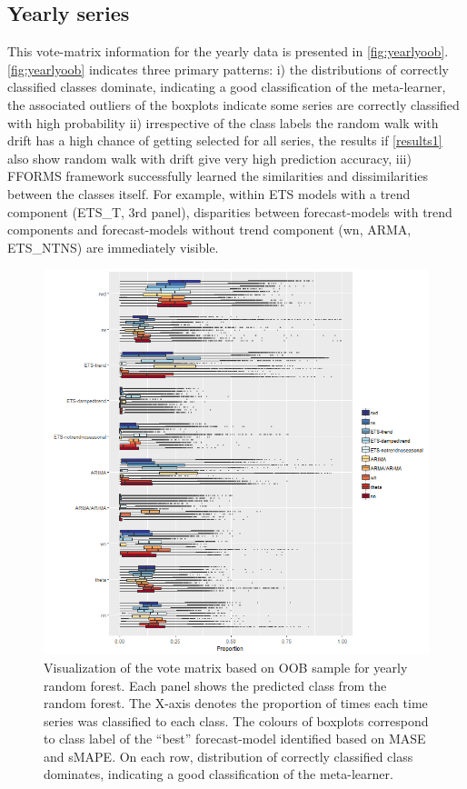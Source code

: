 \documentclass[11pt,a4paper,]{article}
\begin{document}
\hypertarget{yearly-series}{%
\subsection{Yearly series}\label{yearly-series}}

This vote-matrix information for the yearly data is presented in \autoref{fig:yearlyoob}. \autoref{fig:yearlyoob} indicates three primary patterns: i) the distributions of correctly classified classes dominate, indicating a good classification of the meta-learner, the associated outliers of the boxplots indicate some series are correctly classified with high probability ii) irrespective of the class labels the random walk with drift has a high chance of getting selected for all series, the results if \autoref{results1} also show random walk with drift give very high prediction accuracy, iii) FFORMS framework successfully learned the similarities and dissimilarities between the classes itself. For example, within ETS models with a trend component (ETS\_T, 3rd panel), disparities between forecast-models with trend components and forecast-models without trend component (wn, ARMA, ETS\_NTNS) are immediately visible.

\begin{figure}
\centering
\includegraphics{figures/yearlyoob-1.png}
\caption{\label{fig:yearlyoob}Visualization of the vote matrix based on OOB sample for yearly random forest. Each panel shows the predicted class from the random forest. The X-axis denotes the proportion of times each time series was classified to each class. The colours of boxplots correspond to class label of the ``best'' forecast-model identified based on MASE and sMAPE. On each row, distribution of correctly classified class dominates, indicating a good classification of the meta-learner.}
\end{figure}
\end{document}
